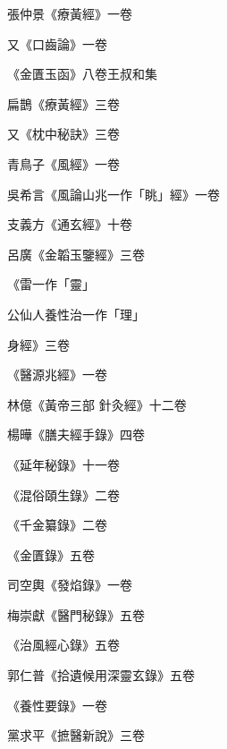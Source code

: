 \begin{pinyinscope}
 張仲景《療黃經》一卷



 又《口齒論》一卷



 《金匱玉函》八卷王叔和集



 扁鵲《療黃經》三卷



 又《枕中秘訣》三卷



 青鳥子《風經》一卷



 吳希言《風論山兆一作「眺」經》一卷



 支義方《通玄經》十卷



 呂廣《金韜玉鑒經》三卷



 《雷一作「靈」



 公仙人養性治一作「理」



 身經》三卷



 《醫源兆經》一卷



 林億《黃帝三部
 針灸經》十二卷



 楊曄《膳夫經手錄》四卷



 《延年秘錄》十一卷



 《混俗頤生錄》二卷



 《千金纂錄》二卷



 《金匱錄》五卷



 司空輿《發焰錄》一卷



 梅崇獻《醫門秘錄》五卷



 《治風經心錄》五卷



 郭仁普《拾遺候用深靈玄錄》五卷



 《養性要錄》一卷



 黨求平《摭醫新說》三卷




\end{pinyinscope}
